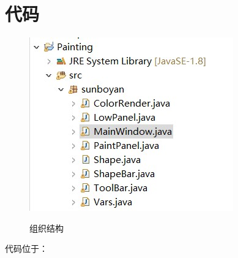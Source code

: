 \documentclass{ctexart}
\begin{document}
\section{代码}
\begin{figure}[htbp]
    \centering
    \caption{组织结构}
    \includegraphics[scale = 0.8]{12.jpg}
    \label{fig:11}
\end{figure}
代码位于：
\end{document}
